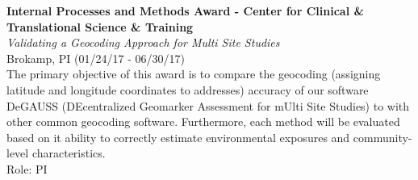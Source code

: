 \documentclass{nihbiosketch}
\begin{document}
\textbf{Internal Processes and Methods Award - Center for Clinical \&
Translational Science \& Training}\\
\emph{Validating a Geocoding Approach for Multi Site Studies}\\
Brokamp, PI (01/24/17 - 06/30/17)\\
The primary objective of this award is to compare the geocoding
(assigning latitude and longitude coordinates to addresses) accuracy of
our software DeGAUSS (DEcentralized Geomarker Assessment for mUlti Site
Studies) to with other common geocoding software. Furthermore, each
method will be evaluated based on it ability to correctly estimate
environmental exposures and community-level characteristics.\\
Role: PI

\bigskip
\end{document}
